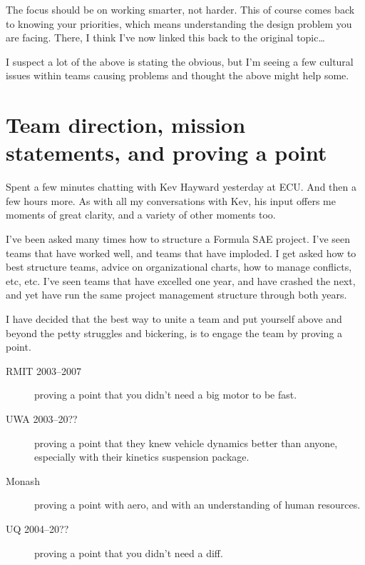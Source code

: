 \documentclass[10pt, a4paper, article, oneside, twocolumn, final]{memoir}
\begin{document}
The focus should be on working smarter, not harder. This of course comes back to knowing your priorities, which means understanding the design problem you are facing. There, I think I've now linked this back to the original topic\ldots

I suspect a lot of the above is stating the obvious, but I’m seeing a few cultural issues within teams causing problems and thought the above might help some.



\chapter*{Team direction, mission statements, and proving a point}

Spent a few minutes chatting with Kev Hayward yesterday at ECU. And then a few hours more. As with all my conversations with Kev, his input offers me moments of great clarity, and a variety of other moments too. 

I’ve been asked many times how to structure a Formula SAE project. I’ve seen teams that have worked well, and teams that have imploded. I get asked how to best structure teams, advice on organizational charts, how to manage conflicts, etc, etc. I’ve seen teams that have excelled one year, and have crashed the next, and yet have run the same project management structure through both years. 

I have decided that the best way to unite a team and put yourself above and beyond the petty struggles and bickering, is to engage the team by proving a point. 

\begin{description}
    \item[RMIT 2003--2007] proving a point that you didn’t need a big motor to be fast.
    \item[UWA 2003--20??] proving a point that they knew vehicle dynamics better than anyone, especially with their kinetics suspension package.
    \item[Monash] proving a point with aero, and with an understanding of human resources. 
    \item[UQ 2004--20??] proving a point that you didn’t need a diff.
\end{description}
\end{document}
